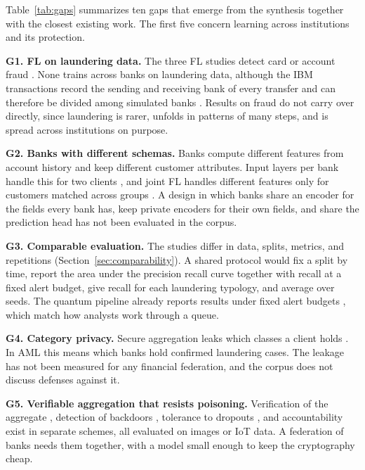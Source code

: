 \documentclass[journal]{IEEEtran}
\begin{document}
Table~\ref{tab:gaps} summarizes ten gaps that emerge from the synthesis together with the closest existing work. The first five concern learning across institutions and its protection.

\textbf{G1. FL on laundering data.} The three FL studies detect card or account fraud \cite{tang2024sdt,awosika2024xai,li2026plc}. None trains across banks on laundering data, although the IBM transactions record the sending and receiving bank of every transfer and can therefore be divided among simulated banks \cite{altman2023ibmaml,mao2026pmegnn}. Results on fraud do not carry over directly, since laundering is rarer, unfolds in patterns of many steps, and is spread across institutions on purpose.

\textbf{G2. Banks with different schemas.} Banks compute different features from account history and keep different customer attributes. Input layers per bank handle this for two clients \cite{tang2024sdt}, and joint FL handles different features only for customers matched across groups \cite{li2026plc}. A design in which banks share an encoder for the fields every bank has, keep private encoders for their own fields, and share the prediction head has not been evaluated in the corpus.

\textbf{G3. Comparable evaluation.} The studies differ in data, splits, metrics, and repetitions (Section~\ref{sec:comparability}). A shared protocol would fix a split by time, report the area under the precision recall curve together with recall at a fixed alert budget, give recall for each laundering typology, and average over seeds. The quantum pipeline already reports results under fixed alert budgets \cite{nayak2026quantum}, which match how analysts work through a queue.

\textbf{G4. Category privacy.} Secure aggregation leaks which classes a client holds \cite{gao2023category}. In AML this means which banks hold confirmed laundering cases. The leakage has not been measured for any financial federation, and the corpus does not discuss defenses against it.

\textbf{G5. Verifiable aggregation that resists poisoning.} Verification of the aggregate \cite{wang2023vosa}, detection of backdoors \cite{zhang2023safelearning}, tolerance to dropouts \cite{wang2023vosa}, and accountability \cite{yang2022accountable} exist in separate schemes, all evaluated on images or IoT data. A federation of banks needs them together, with a model small enough to keep the cryptography cheap.
\end{document}
